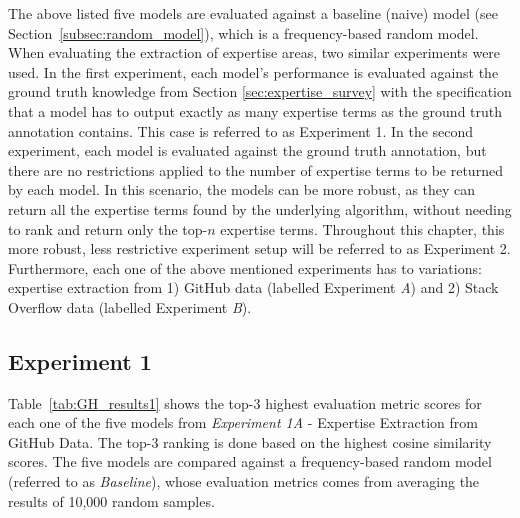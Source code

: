         The above listed five models are evaluated against a baseline (naive) model (see Section~\ref{subsec:random_model}), which is a frequency-based random model. When evaluating the extraction of expertise areas, two similar experiments were used. In the first experiment, each model's performance is evaluated against the ground truth knowledge from Section \ref{sec:expertise_survey} with the specification that a model has to output exactly as many expertise terms as the ground truth annotation contains. This case is referred to as Experiment 1. In the second experiment, each model is evaluated against the ground truth annotation, but there are no restrictions applied to the number of expertise terms to be returned by each model. In this scenario, the models can be more robust, as they can return all the expertise terms found by the underlying algorithm, without needing to rank and return only the top-$n$ expertise terms. Throughout this chapter, this more robust, less restrictive experiment setup will be referred to as Experiment 2. Furthermore, each one of the above mentioned experiments has to variations: expertise extraction from 1) GitHub data (labelled Experiment \emph{A}) and 2) Stack Overflow data (labelled Experiment \emph{B}).
        
        \subsection{Experiment 1}
        
            Table~\ref{tab:GH_results1} shows the top-$3$ highest evaluation metric scores for each one of the five models from \emph{Experiment 1A} - Expertise Extraction from GitHub Data. The top-$3$ ranking is done based on the highest cosine similarity scores. The five models are compared against a frequency-based random model (referred to as \emph{Baseline}), whose evaluation metrics comes from averaging the results of 10,000 random samples.
            
